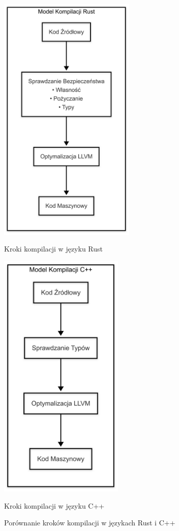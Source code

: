 \begin{figure}[H]
    \centering
    \begin{minipage}{.5\textwidth}
        \centering
        \includegraphics[height=12cm]{images/RustBuildsSteps.png}
        \caption{Kroki kompilacji w języku Rust}
        \label{fig:rust_build_steps}
    \end{minipage}%
    \begin{minipage}{.5\textwidth}
        \centering
        \includegraphics[height=12cm]{images/CppBuildsSteps.png}
        \caption{Kroki kompilacji w języku C++}
        \label{fig:cpp_build_steps}
    \end{minipage}
    \caption{Porównanie kroków kompilacji w językach Rust i C++}
\end{figure}


